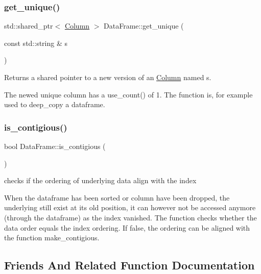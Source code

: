 \subsubsection{\texorpdfstring{get\+\_\+unique()}{get\_unique()}}
{\footnotesize\ttfamily std\+::shared\+\_\+ptr$<$ \hyperlink{classColumn}{Column} $>$ Data\+Frame\+::get\+\_\+unique (\begin{DoxyParamCaption}\item[{const std\+::string \&}]{s }\end{DoxyParamCaption})}



Returns a shared pointer to a new version of an \hyperlink{classColumn}{Column} named s. 

The newed unique column has a use\+\_\+count() of 1. The function is, for example used to deep\+\_\+copy a dataframe. \mbox{\label{classDataFrame_a40f6420c823601946d56ba625484a74e}} 
\subsubsection{\texorpdfstring{is\+\_\+contigious()}{is\_contigious()}}
{\footnotesize\ttfamily bool Data\+Frame\+::is\+\_\+contigious (\begin{DoxyParamCaption}{ }\end{DoxyParamCaption})}



checks if the ordering of underlying data align with the index 

When the dataframe has been sorted or column have been dropped, the underlying still exist at its old position, it can however not be accessed anymore (through the dataframe) as the index vanished. The function checks whether the data order equals the index ordering. If false, the ordering can be aligned with the function {\ttfamily make\+\_\+contigious}. 

\subsection{Friends And Related Function Documentation}
\mbox{\label{classDataFrame_ac665e1df1c1d41e0d0c5afcdfb827a74}} 

